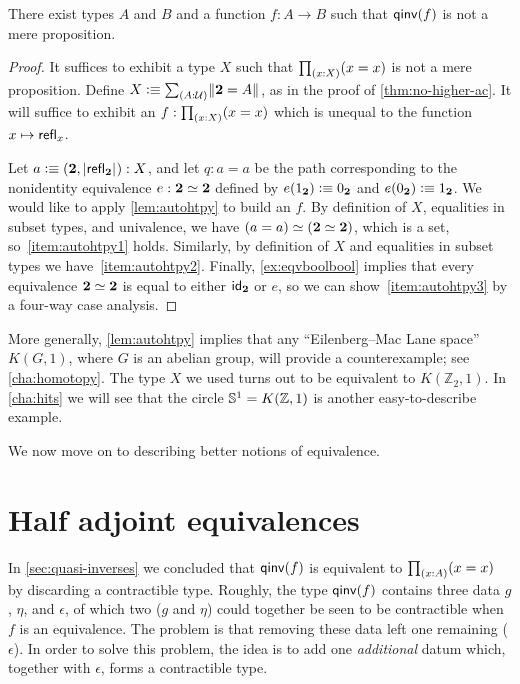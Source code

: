 \begin{thm}
  There exist types $A$ and $B$ and a function $f:A\to B$ such that $\qinv(f)$ is not a mere proposition.
\end{thm}
\begin{proof}
  It suffices to exhibit a type $X$ such that $\prd{x:X} (x=x)$ is not a mere proposition.
  Define $X\defeq \sm{A:\type} \brck{\bool=A}$, as in the proof of \autoref{thm:no-higher-ac}.
  It will suffice to exhibit an $f:\prd{x:X} (x=x)$ which is unequal to the function $x\mapsto \refl{x}$.

  Let $a \defeq (\bool,\bproj{\refl{\bool}}) : X$, and let $q:a=a$ be the path corresponding to the nonidentity equivalence $e:\eqv\bool\bool$ defined by $e(\btrue)\defeq\bfalse$ and $e(\bfalse)\defeq\btrue$.
  We would like to apply \autoref{lem:autohtpy} to build an $f$.
  By definition of $X$, equalities in subset types, and univalence, we have $\eqv{(a=a)}{(\eqv{\bool}{\bool})}$, which is a set, so~\ref{item:autohtpy1} holds.
  Similarly, by definition of $X$ and equalities in subset types we have~\ref{item:autohtpy2}.
  Finally, \autoref{ex:eqvboolbool} implies that every equivalence $\eqv\bool\bool$ is equal to either $\idfunc[\bool]$ or $e$, so we can show~\ref{item:autohtpy3} by a four-way case analysis.
\end{proof}

More generally, \autoref{lem:autohtpy} implies that any ``Eilenberg--Mac Lane space'' $K(G,1)$, where $G$ is an abelian group, will provide a counterexample; see \autoref{cha:homotopy}.
The type $X$ we used turns out to be equivalent to $K(\mathbb{Z}_2,1)$.
In \autoref{cha:hits} we will see that the circle $\Sn^1 = K(\mathbb{Z},1)$ is another easy-to-describe example.

We now move on to describing better notions of equivalence.


\section{Half adjoint equivalences}
\label{sec:hae}

In \autoref{sec:quasi-inverses} we concluded that $\qinv(f)$ is equivalent to $\prd{x:A} (x=x)$ by discarding a contractible type.
Roughly, the type $\qinv(f)$ contains three data $g$, $\eta$, and $\epsilon$, of which two ($g$ and $\eta$) could together be seen to be contractible when $f$ is an equivalence.
The problem is that removing these data left one remaining ($\epsilon$).
In order to solve this problem, the idea is to add one \emph{additional} datum which, together with $\epsilon$, forms a contractible type.

